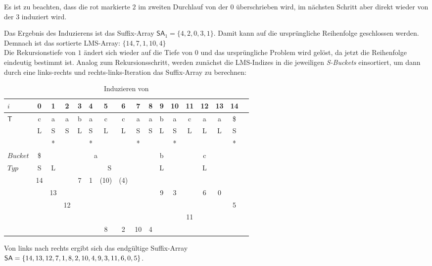 \noindent Es ist zu beachten, dass die rot markierte $2$ im zweiten Durchlauf von der $0$ überschrieben wird, im nächsten Schritt aber direkt wieder von der $3$ induziert wird.

Das Ergebnis des Induzierens ist das Suffix-Array $\mathsf{SA}_1 = \{4, 2, 0, 3, 1\}$. Damit kann auf die ursprüngliche Reihenfolge geschlossen werden. Demnach ist das sortierte LMS-Array: $\{14, 7, 1, 10, 4\}$ \\
Die Rekursionstiefe von $1$ ändert sich wieder auf die Tiefe von $0$ und das ursprüngliche Problem wird gelöst, da jetzt die Reihenfolge eindeutig bestimmt ist. Analog zum Rekursionsschritt, werden zunächst die LMS-Indizes in die jeweiligen \textit{S-Buckets} einsortiert, um dann durch eine links-rechts und rechts-links-Iteration das Suffix-Array \sa zu berechnen:

\begin{table}[H]
\centering
\begin{adjustbox}{width=1\textwidth}
  \begin{tabular}{ | l | c | c | c | c | c | c | c | c | c | c | c | c | c | c | c | c | }
    \hline
        $i$ & 0 & 1 & 2 & 3 & 4 & 5 & 6 & 7 & 8 & 9 & 10 & 11 & 12 & 13 & 14 \\ \hline
        $\mathsf{T}$ & c & a & a & b & a & c & c & a & a & b & a & c & a & a & \$ \\ \hline
            & L & S & S & L & S & L & L & S & S & L & S & L & L & L & S \\ \hline
            &   & * &   &   & * &   &   & * &   &   & * &   &   &   & * \\ \hline
   $Bucket$ &\$ & \multicolumn{7}{c}{a} &   & \multicolumn{1}{c}{b} &   & \multicolumn{3}{c}{c} & \\ \hline
      $Typ$ & S & \multicolumn{1}{c}{L} &   & \multicolumn{5}{c}{S} &   & \multicolumn{1}{c}{L} &    & \multicolumn{3}{c}{L} &\\ \hline
            & 14 & & & 7 & 1 & (10) & (4) & & &  &   & &   &   &  \\ \hline
            & & 13 & & & & & & & & 9 & 3 & & 6 & 0 & \\ \hline
            &  &  & 12 & & & & & & & & & & &  & 5 \\ \hline
            & & & & & &   & & &   &   & & 11 & & & \\ \hline
            & & & & & & 8 & 2 & 10 & 4 &   & &   &   &   & \\
    \hline
  \end{tabular}
  \end{adjustbox}
  \caption{Induzieren von \sa}
\end{table}
\bigskip
\noindent Von links nach rechts ergibt sich das endgültige Suffix-Array \\
$\sa = \{14, 13, 12, 7, 1, 8, 2, 10, 4, 9, 3, 11, 6, 0, 5\}$.


